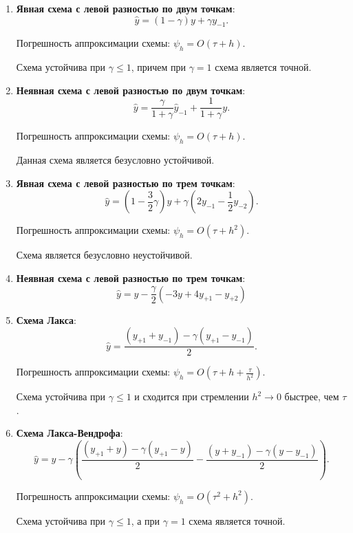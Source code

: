 \documentclass[12pt, a4paper]{article}
\begin{document}
\begin{enumerate}
	
	\item \textbf{Явная схема с левой разностью по двум точкам}:
	\begin{equation*}
		\widehat{y} = (1 - \gamma) y + \gamma y_{-1}.
	\end{equation*}
	
	Погрешность аппроксимации схемы: 
	$\psi_h = O(\tau + h)$.
	
	Схема устойчива при $\gamma \leq 1 $, причем при $\gamma = 1$ схема является точной.
	
	
	\item \textbf{Неявная схема с левой разностью по двум точкам}:
	\begin{equation*}
		\widehat{y} = \dfrac{\gamma}{1 + \gamma} \widehat{y}_{-1} + \dfrac{1}{1 + \gamma} y .
	\end{equation*}
	
	Погрешность аппроксимации схемы: $\psi_h = O(\tau + h)$.
	
	Данная схема является безусловно устойчивой.
	
	
	\item \textbf{Явная схема с левой разностью по трем точкам}:
	\begin{equation*}
		\widehat{y} = (1 - \frac{3}{2}\gamma) y + \gamma(2y_{-1} - \frac{1}{2}y_{-2}).
	\end{equation*}
	
	Погрешность аппроксимации схемы: 
	$\psi_h = O(\tau + h^2)$.
	
	Схема является безусловно неустойчивой.
	
	
	\item \textbf{Неявная схема с левой разностью по трем точкам}:
	\begin{equation*}
		\widehat{y} = y - \frac{\gamma}{2} (-3y + 4y_{+1} - y_{+2})
	\end{equation*}
	
	\item \textbf{Схема Лакса}:
	\begin{equation*}
		\widehat{y} = \dfrac{(y_{+1} + y_{-1}) - \gamma(y_{+1} - y_{-1})}{2} .
	\end{equation*}
	
	Погрешность аппроксимации схемы: $\psi_h = O(\tau + h + \frac{\tau}{h^2})$.
	
	Схема устойчива при $\gamma \leq 1 $ и сходится при стремлении $h^2 \to 0$ быстрее, чем $\tau$.
	
	\item \textbf{Схема Лакса-Вендрофа}:
	\begin{equation*}
		\widehat{y} = y - \gamma(\dfrac{(y_{+1} + y) - \gamma (y_{+1} - y)}{2} -  \dfrac{(y + y_{-1}) - \gamma (y - y_{-1})}{2}).
	\end{equation*}
	
	Погрешность аппроксимации схемы: 
	$\psi_h = O(\tau^2 + h^2)$.
	
	Схема устойчива при $\gamma \leq 1 $, а при $\gamma = 1$ схема является точной. 
	
\end{enumerate}
\end{document}
